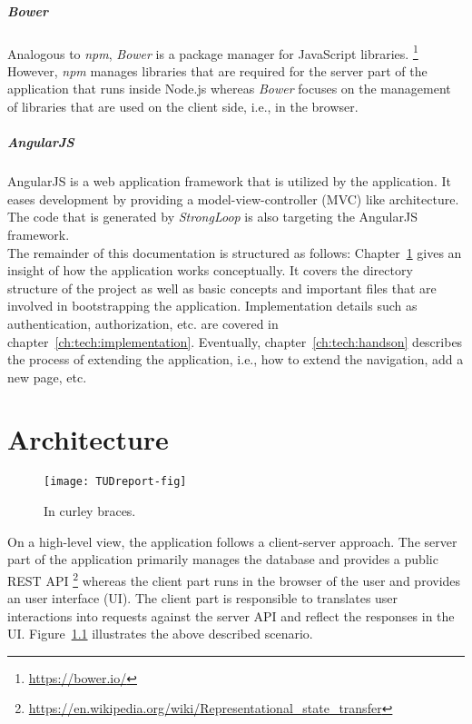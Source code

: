 \documentclass[nochapterpage,nopartpage,noheadingspace,numbersubsubsec,bigchapter,colorback,accentcolor=tud9c,10pt]{tudreport}
\begin{document}
  \paragraph{Bower}
    Analogous to \emph{npm}, \emph{Bower} is a package manager for JavaScript libraries.%
    \footnote{\url{https://bower.io/}}
    However, \emph{npm} manages libraries that are required for the server part of the application that runs inside Node.js whereas \emph{Bower} focuses on the management of libraries that are used on the client side, i.e., in the browser.

  \paragraph{AngularJS}
    AngularJS is a web application framework that is utilized by the application. It eases development by providing a model-view-controller (MVC) like architecture. The code that is generated by \emph{StrongLoop} is also targeting the AngularJS framework.\\


    The remainder of this documentation is structured as follows: Chapter~\ref{ch:tech:architecture} gives an insight of how the application works conceptually. It covers the directory structure of the project as well as basic concepts and important files that are involved in bootstrapping the application. Implementation details such as authentication, authorization, etc. are covered in chapter~\ref{ch:tech:implementation}. Eventually, chapter~\ref{ch:tech:handson} describes the process of extending the application, i.e., how to extend the navigation, add a new page, etc.

  \chapter{Architecture}
  \label{ch:tech:architecture}

        \begin{figure}
            \centering
            \texttt{[image: TUDreport-fig]}
            \caption{In curley braces.}
            \label{fig:client-server}
        \end{figure}
    On a high-level view, the application follows a client-server approach. The server part of the application primarily manages the database and provides a public REST API%
    \footnote{\url{https://en.wikipedia.org/wiki/Representational_state_transfer}}
    whereas the client part runs in the browser of the user and provides an user interface (UI). The client part is responsible to translates user interactions into requests against the server API and reflect the responses in the UI. Figure~\ref{fig:client-server} illustrates the above described scenario.
\end{document}
